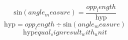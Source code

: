 \[\text{{sin}}({angle_measure})=\frac{{{opp_length}}}{{\text{{{hyp}}}}}\]
\[\text{{{hyp}}}={opp_length}\div \text{{sin}}({angle_measure})\]
\[\text{{{hyp}}}{equal_sign}{result_with_unit}\]
